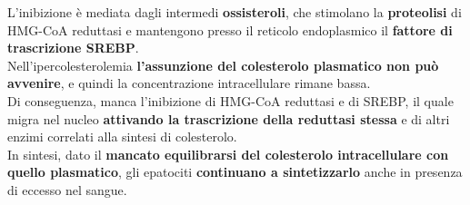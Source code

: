 \documentclass[a4paper, 12pt]{article}
\begin{document}
\begin{titlepage}
\begin{center}
\end{center}

L'inibizione è mediata dagli intermedi \textbf{ossisteroli}, che stimolano la \textbf{proteolisi} di HMG-CoA reduttasi e mantengono presso il reticolo endoplasmico il \textbf{fattore di trascrizione SREBP}.\\
Nell'ipercolesterolemia \textbf{l'assunzione del colesterolo plasmatico non può avvenire}, e quindi la concentrazione intracellulare rimane bassa.\\
Di conseguenza, manca l'inibizione di HMG-CoA reduttasi e di SREBP, il quale migra nel nucleo \textbf{attivando la trascrizione della reduttasi stessa} e di altri enzimi correlati alla sintesi di colesterolo.\\
In sintesi, dato il \textbf{mancato equilibrarsi del colesterolo intracellulare con quello plasmatico}, gli epatociti \textbf{continuano a sintetizzarlo} anche in presenza di eccesso nel sangue.



\end{titlepage}
\end{document}
